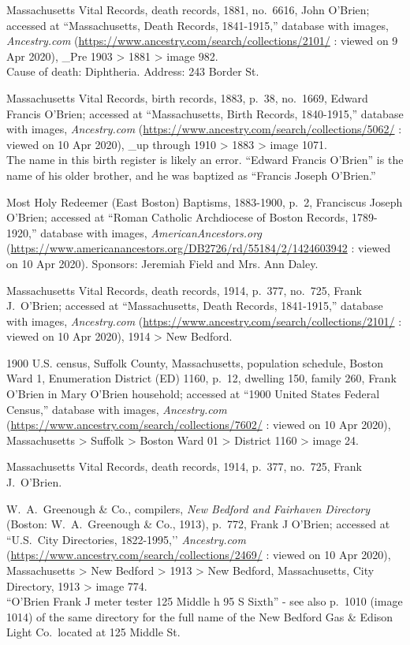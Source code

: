 \begin{thebibliography}{999}
Massachusetts Vital Records, death records, 1881, no.\ 6616, John O'Brien; accessed at ``Massachusetts, Death Records, 1841-1915,'' database with images, \textit{Ancestry.com} (\url{https://www.ancestry.com/search/collections/2101/} : viewed on 9 Apr 2020), \_Pre 1903 > 1881 > image 982.\\
Cause of death: Diphtheria. Address: 243 Border St.

Massachusetts Vital Records, birth records, 1883, p.\ 38, no.\ 1669, Edward Francis O'Brien; accessed at ``Massachusetts, Birth Records, 1840-1915,'' database with images, \textit{Ancestry.com} (\url{https://www.ancestry.com/search/collections/5062/} : viewed on 10 Apr 2020), \_up through 1910 > 1883 > image 1071.\\
The name in this birth register is likely an error. ``Edward Francis O'Brien'' is the name of his older brother, and he was baptized as ``Francis Joseph O'Brien.''

Most Holy Redeemer (East Boston) Baptisms, 1883-1900, p.\ 2, Franciscus Joseph O'Brien; accessed at ``Roman Catholic Archdiocese of Boston Records, 1789-1920,'' database with images, \textit{AmericanAncestors.org} (\url{https://www.americanancestors.org/DB2726/rd/55184/2/1424603942} : viewed on 10 Apr 2020).	
Sponsors: Jeremiah Field and Mrs. Ann Daley.

Massachusetts Vital Records, death records, 1914, p.\ 377, no.\ 725, Frank J.\ O'Brien; accessed at ``Massachusetts, Death Records, 1841-1915,'' database with images, \textit{Ancestry.com} (\url{https://www.ancestry.com/search/collections/2101/} : viewed on 10 Apr 2020), 1914 > New Bedford.

1900 U.S. census, Suffolk County, Massachusetts, population schedule, Boston Ward 1, Enumeration District (ED) 1160, p.\ 12, dwelling 150, family 260, Frank O'Brien in Mary O'Brien household; accessed at ``1900 United States Federal Census,'' database with images, \textit{Ancestry.com} (\url{https://www.ancestry.com/search/collections/7602/} : viewed on 10 Apr 2020), Massachusetts > Suffolk > Boston Ward 01 > District 1160 > image 24.

Massachusetts Vital Records, death records, 1914, p.\ 377, no.\ 725, Frank J.\ O'Brien.

W.\ A.\ Greenough \& Co., compilers, \textit{New Bedford and Fairhaven Directory} (Boston: W.\ A.\ Greenough \& Co., 1913), p.\ 772, Frank J O'Brien; accessed at ``U.S.\ City Directories, 1822-1995,’’ \textit{Ancestry.com} (\url{https://www.ancestry.com/search/collections/2469/} : viewed on 10 Apr 2020), Massachusetts > New Bedford > 1913 > New Bedford, Massachusetts, City Directory, 1913 > image 774.\\
``O'Brien Frank J meter tester 125 Middle h 95 S Sixth'' - see also p.\ 1010 (image 1014) of the same directory for the full name of the New Bedford Gas \& Edison Light Co.\ located at 125 Middle St.


\end{thebibliography}
